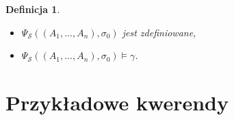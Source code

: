 \documentclass[11pt,a4paper]{article}
\newtheorem{defn}{Definicja}
\begin{document}
\begin{defn}
\begin{enumerate}
        \begin{itemize}
            \item $\Psi_\mathcal{S}((A_1,...,A_n),\sigma_{0})$ jest zdefiniowane,
            \item $\Psi_\mathcal{S}((A_1,...,A_n),\sigma_{0}) \models \gamma$.
        \end{itemize}
    \end{enumerate}
\end{defn}

\section{Przykładowe kwerendy}

\end{document}
